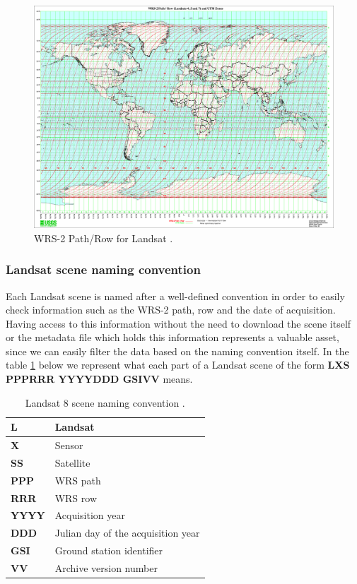\documentclass[12pt, a4paper]{report}
\begin{document}
	\begin{figure}[h!]
		\centering
		\includegraphics[scale=0.2]{../images/wrs2.png}
		\caption{WRS-2 Path/Row for Landsat \cite{wrs}.}
		\label{fig:wrs2}
	\end{figure}
	
	\subsubsection{Landsat scene naming convention}
	\label{seq:landsat_naming}
	
	\par Each Landsat scene is named after a well-defined convention in order to easily check information such as the WRS-2 path, row and the date of acquisition. Having access to this information without the need to download the scene itself or the metadata file which holds this information represents a valuable asset, since we can easily filter the data based on the naming convention itself. In the table \ref{table:landsat_table} below we represent what each part of a Landsat scene of the form \textbf{LXS PPPRRR YYYYDDD GSIVV} means.
	\begin{table} [h!]
		\center
		\begin{tabularx}{480pt}{|X|X|}
			\toprule
			\textbf{L} & Landsat \\ [0.2ex]
			\midrule
			\textbf{X} & Sensor \\ [0.2ex]
			\midrule
			\textbf{SS} & Satellite \\ [0.2ex]
			\midrule
			\textbf{PPP} & WRS path \\ [0.2ex]
			\midrule
			\textbf{RRR} & WRS row \\ [0.2ex]
			\midrule
			\textbf{YYYY} & Acquisition year \\ [0.2ex]
			\midrule
			\textbf{DDD} & Julian day of the acquisition year \\ [0.2ex]
			\midrule
			\textbf{GSI} & Ground station identifier \\ [0.2ex]
			\midrule
			\textbf{VV} & Archive version number \\ [0.2ex]
			\midrule
			\midrule
			\bottomrule
		\end{tabularx}
		\caption{Landsat 8 scene naming convention \cite{sn}.}
		\label{table:landsat_table}
	\end{table}
	
\end{document}
